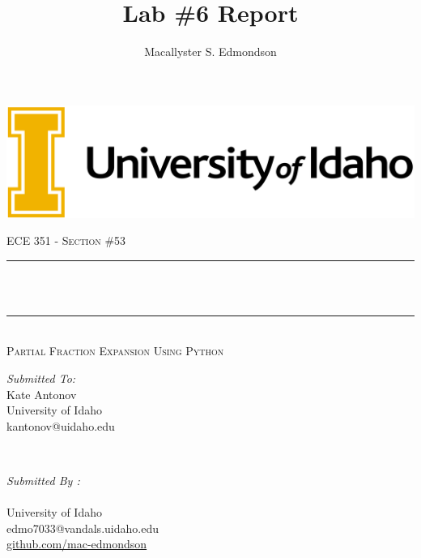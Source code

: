 \documentclass[12pt]{report}
\title{Lab \#6 Report}
\author{Macallyster S. Edmondson}
\date{\longdate\displaydate{date}}
\makeatletter
\let\thetitle\@title
\let\theauthor\@author
\makeatother
\begin{document}
\begin{titlepage}\thispagestyle{titlepage}
\centering
\includegraphics[scale = 0.12]{univ-logo.png}\\[1.0 cm]
\begin{center}    \textsc{\Large   ECE 351 - Section \#53 }\\[2.0 cm]
\end{center}%

\rule{\linewidth}{0.2 mm} \\[0.4 cm]
{ \huge \bfseries \thetitle}\\
\rule{\linewidth}{0.2 mm} \\[0.5 cm]
\textsc{\Large Partial Fraction Expansion Using Python }\\[1.5 cm] %
\begin{minipage}{0.4\textwidth}
\begin{flushleft} \large
\emph{Submitted To:}\\
Kate Antonov\\ \small
University of Idaho\\
kantonov@uidaho.edu\\
\hfill
\end{flushleft}
\end{minipage}~
\begin{minipage}{0.4\textwidth}
\begin{flushright} \large
\emph{Submitted By :} \\
\theauthor \\ \small
University of Idaho\\
edmo7033@vandals.uidaho.edu\\
\href{http://github.com/mac-edmondson}{github.com/mac-edmondson}\\
\end{flushright}
\end{minipage}\\[2 cm]
\vfill
\end{titlepage}
\tableofcontents\thispagestyle{customplain}
\pagebreak
\renewcommand{\thesection}{\arabic{section}}
\end{document}

